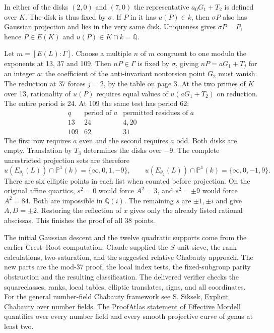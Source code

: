 \documentclass[12pt]{article}
\newcommand{\Q}{\mathbb Q}\newcommand{\Z}{\mathbb Z}\newcommand{\F}{\mathbb F}
\newcommand{\subh}[1]{\par\smallskip{\bfseries\color{accent}#1}\par}
\begin{document}
In either of the disks $(2,0)$ and $(7,0)$ the representative $a_0G_1+T_2$ is defined over $K$. The disk is thus fixed by $\sigma$. If $P$ in it has $u(P)\in k$, then $\sigma P$ also has Gaussian projection and lies in the very same disk. Uniqueness gives $\sigma P=P$, hence $P\in E(K)$ and $u(P)\in K\cap k=\Q$.

Let $m=[E(L):\Gamma]$. Choose a multiple $n$ of $m$ congruent to one modulo the exponents at 13, 37 and 109. Then $nP\in\Gamma$ is fixed by $\sigma$, giving $nP=aG_1+T_j$ for an integer $a$: the coefficient of the anti-invariant nontorsion point $G_2$ must vanish. The reduction at 37 forces $j=2$, by the table on page 3. At the two primes of $K$ over 13, rationality of $u(P)$ requires equal values of $u(aG_1+T_2)$ on reduction. The entire period is 24. At 109 the same test has period 62:
\[
 \begin{array}{c|c|c}
 q&\text{period of }a&\text{permitted residues of }a\\\hline
 13&24&4,20\\
 109&62&31
 \end{array}
\]
The first row requires $a$ even and the second requires $a$ odd. Both disks are empty. Translation by $T_3$ determines the disks over $-9$. The complete unrestricted projection sets are therefore
\[
  u(E_{\theta_1}(L))\cap\mathbb P^1(k)=\{\infty,0,1,-9\},\qquad
  u(E_{\theta_2}(L))\cap\mathbb P^1(k)=\{\infty,0,-1,9\}.
\]
There are six elliptic points in each list when counted before projection. On the original affine quartics, $s^2=0$ would force $A^2=3$, and $s^2=\pm9$ would force $A^2=84$. Both are impossible in $\Q(i)$. The remaining $s$ are $\pm1,\pm i$ and give $A,D=\pm2$. Restoring the reflection of $x$ gives only the already listed rational abscissas. This finishes the proof of all 38 points.

\subh{Reproducibility and attribution}
The initial Gaussian descent and the twelve quadratic supports come from the earlier Crest--Root computation. Claude supplied the $S$-unit sieve, the rank calculations, two-saturation, and the suggested relative Chabauty approach. The new parts are the mod-37 proof, the local index tests, the fixed-subgroup parity obstruction and the resulting classification. The delivered verifier checks the squareclasses, ranks, local tables, elliptic translates, signs, and all coordinates. For the general number-field Chabauty framework see S. Siksek, \href{https://doi.org/10.2140/ant.2013.7.765}{Explicit Chabauty over number fields}. The \href{https://www.proofatlas.ai/open-problems/}{ProofAtlas statement of Effective Mordell} quantifies over every number field and every smooth projective curve of genus at least two.
\end{document}
